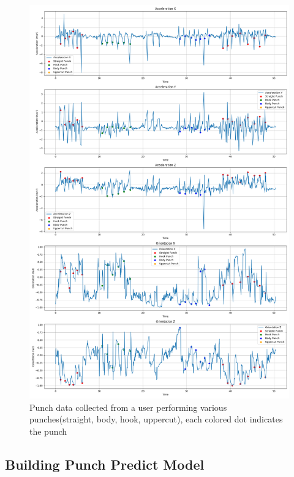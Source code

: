 \documentclass{article}
\begin{document}
\FloatBarrier
\begin{figure}[h]
    \centering
    \includegraphics[width=\textwidth]{punch_data.png}
    \caption{Punch data collected from a user performing various punches(straight, body, hook, uppercut), each colored dot indicates the punch}
    \label{fig:punch_data}
\end{figure}








\subsection{Building Punch Predict Model}
\end{document}
